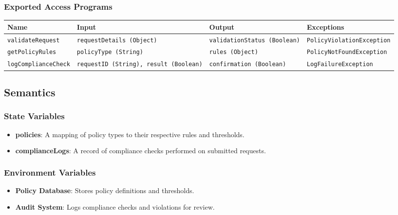 \documentclass[12pt, titlepage]{article}
\begin{document}
\subsubsection{Exported Access Programs}
\begin{center}
    \scriptsize
    \begin{tabular}{|p{3cm}|p{4cm}|p{4cm}|p{4cm}|}
        \hline
        \textbf{Name} & \textbf{Input} & \textbf{Output} & \textbf{Exceptions} \\
        \hline
        \texttt{validateRequest} & \texttt{requestDetails (Object)} & \texttt{validationStatus (Boolean)} & \texttt{PolicyViolationException} \\
        \hline
        \texttt{getPolicyRules} & \texttt{policyType (String)} & \texttt{rules (Object)} & \texttt{PolicyNotFoundException} \\
        \hline
        \texttt{logComplianceCheck} & \texttt{requestID (String), result (Boolean)} & \texttt{confirmation (Boolean)} & \texttt{LogFailureException} \\
        \hline
    \end{tabular}
\end{center}

\subsection{Semantics}

\subsubsection{State Variables}
\begin{itemize}
    \item \textbf{policies}: A mapping of policy types to their respective rules and thresholds.
    \item \textbf{complianceLogs}: A record of compliance checks performed on submitted requests.
\end{itemize}

\subsubsection{Environment Variables}
\begin{itemize}
    \item \textbf{Policy Database}: Stores policy definitions and thresholds.
    \item \textbf{Audit System}: Logs compliance checks and violations for review.
\end{itemize}
\end{document}
